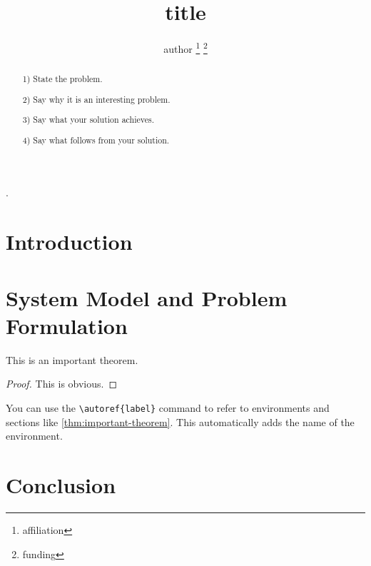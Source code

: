 \documentclass[12pt,english,draftclsnofoot,onecolumn]{IEEEtran} %
\title{{{title}}}
\author{{{author}}
	\thanks{{{affiliation}}}
	\thanks{{{funding}}}
}
\begin{document}
\maketitle

\begin{abstract}\noindent\boldmath
	\color{blue}
	
	1) State the problem.
	
	2) Say why it is an interesting problem.
	
	3) Say what your solution achieves.
	
	4) Say what follows from your solution.
\end{abstract}
\begin{IEEEkeywords}
	.
\end{IEEEkeywords}
\glsresetall

\section{Introduction}\label{sec:introduction}

\section{System Model and Problem Formulation}\label{sec:system-model}


\begin{thm}
	\label{thm:important-theorem}
	This is an important theorem.
\end{thm}
\begin{proof}
	This is obvious.
\end{proof}

You can use the \verb*|\autoref{label}| command to refer to environments and sections like \autoref{thm:important-theorem}.
This automatically adds the name of the environment.

\blinddocument


\section{Conclusion}\label{sec:conclusion}

\printbibliography
\end{document}
